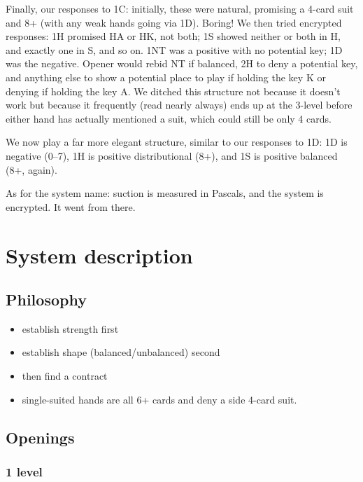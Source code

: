 \documentclass[a4paper,12pt]{article}
\begin{document}
Finally, our responses to 1C: initially, these were natural, promising a 4-card
suit and 8+ (with any weak hands going via 1D).  Boring!  We then tried
encrypted responses: 1H promised HA or HK, not both; 1S showed neither or both
in H, and exactly one in S, and so on.  1NT was a positive with no potential
key; 1D was the negative.  Opener would rebid NT if balanced, 2H to deny a
potential key, and anything else to show a potential place to play if holding
the key K or denying if holding the key A.  We ditched this structure not
because it doesn't work but because it frequently (read nearly always) ends up
at the 3-level before either hand has actually mentioned a suit, which could
still be only 4 cards.

We now play a far more elegant structure, similar to our responses to 1D: 1D is
negative (0--7), 1H is positive distributional (8+), and 1S is positive balanced
(8+, again).

As for the system name: suction is measured in Pascals, and the system is
encrypted.  It went from there.

\section{System description}

\subsection{Philosophy}

\begin{itemize}
\item establish strength first
\item establish shape (balanced/unbalanced) second
\item then find a contract
\item single-suited hands are all 6+ cards and deny a side 4-card suit.
\end{itemize}

\subsection{Openings}

\subsubsection{1 level}
\end{document}
